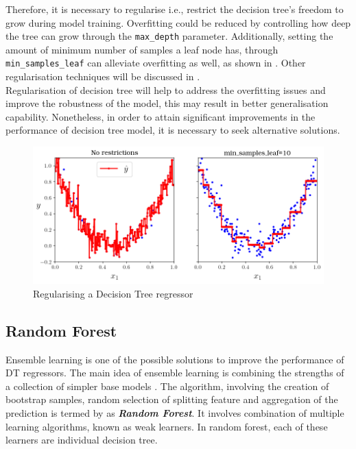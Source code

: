 Therefore, it is necessary to regularise i.e., restrict the decision tree's freedom to grow during model training. Overfitting could be reduced by controlling how deep the tree can grow through the {\tt max\_depth} parameter. Additionally, setting the amount of minimum number of samples a leaf node has, through {\tt min\_samples\_leaf} can alleviate overfitting as well, as shown in . Other regularisation techniques will be discussed in .\\ 

Regularisation of decision tree will help to address the overfitting issues and improve the robustness of the model, this may result in better generalisation capability. Nonetheless, in order to attain significant improvements in the performance of decision tree model, it is necessary to seek alternative solutions.\\

\begin{figure}
    \centering
        \includegraphics[width=.9\textwidth]{02_figures/fig6_6_paramdepth_geron09.png}
        \caption{Regularising a Decision Tree regressor }
        \label{fig:geron6_6}
\end{figure}

\subsection{Random Forest}\label{sec:rf_theo}

Ensemble learning is one of the possible solutions to improve the performance of DT regressors. The main idea of ensemble learning is combining the strengths of a collection of simpler base models . The algorithm, involving the creation of bootstrap samples, random selection of splitting feature and aggregation of the prediction is termed by  as \textbf{\emph{Random Forest}}. It involves combination of multiple learning algorithms, known as weak learners. In random forest, each of these learners are individual decision tree.\\

